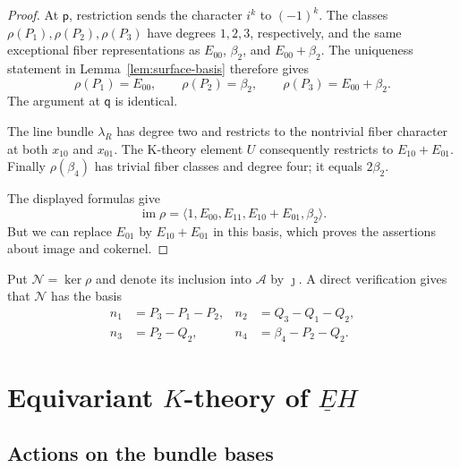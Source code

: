 \documentclass[11pt]{amsart}
\theoremstyle{remark}
\numberwithin{equation}{section}
\begin{document}
\begin{proof}
At $\mathsf p$, restriction sends the character $i^k$ to $(-1)^k$.
The classes $\rho(P_1),\rho(P_2),\rho(P_3)$ have degrees $1,2,3$,
respectively, and the same exceptional fiber representations as
$E_{00}$, $\beta_2$, and $E_{00}+\beta_2$. The uniqueness statement in
Lemma~\ref{lem:surface-basis} therefore gives
\[
 \rho(P_1)=E_{00},\qquad
 \rho(P_2)=\beta_2,\qquad
 \rho(P_3)=E_{00}+\beta_2.
\]
The argument at $\mathsf q$ is identical.


The line bundle $\lambda_R$ has degree two and restricts to the nontrivial fiber character at both $x_{10}$ and $x_{01}$. The K-theory element $U$ consequently restricts to $E_{10}+E_{01}$. Finally $\rho(\beta_4)$ has trivial fiber classes and degree four;
it equals $2\beta_2$. 

The displayed formulas give
\begin{equation}\label{eq:image}
 \operatorname{im}\rho=
 \langle1,E_{00},E_{11},E_{10}+E_{01},\beta_2\rangle.
\end{equation}
But we can replace $E_{01}$ by $E_{10}+E_{01}$ in this basis, which proves the assertions about image and cokernel.
\end{proof}

Put $\mathcal N=\ker\rho$ and denote its inclusion into $\mathcal A$ by $\jmath$. A direct verification gives that $\mathcal N$ has the basis
\begin{equation}\label{eq:kernel-basis}
\begin{aligned}
 n_1&=P_3-P_1-P_2,& n_2&=Q_3-Q_1-Q_2,\\
 n_3&=P_2-Q_2,& n_4&=\beta_4-P_2-Q_2.
\end{aligned}
\end{equation}

\section{Equivariant \texorpdfstring{$K$}{K}-theory of
\texorpdfstring{$\underline{E}H$}{EH}}

\subsection{Actions on the bundle bases}
\end{document}
